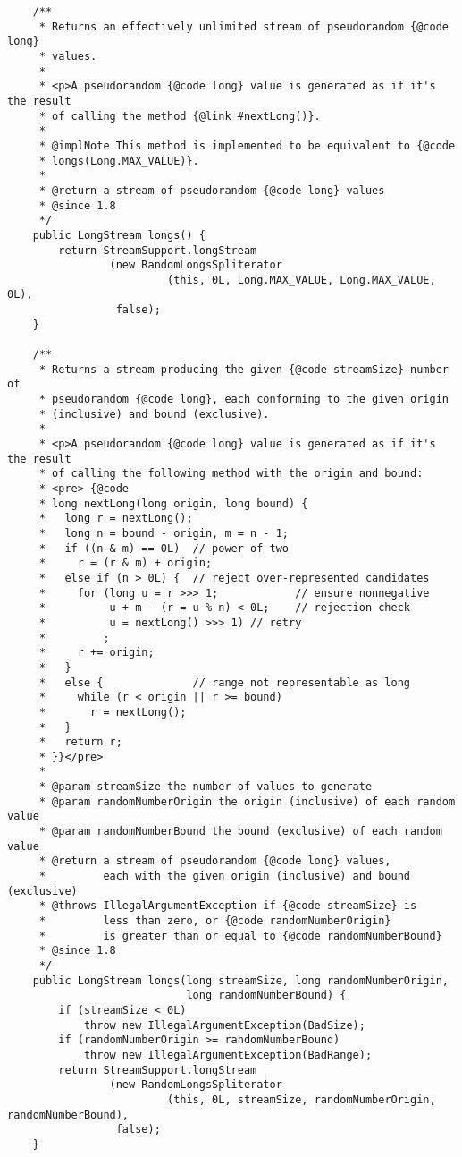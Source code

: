 \documentclass[12pt,a4paper,twoside,openright,titlepage,final]{article}
\begin{document}
\begin{verbatim}
    /**
     * Returns an effectively unlimited stream of pseudorandom {@code long}
     * values.
     *
     * <p>A pseudorandom {@code long} value is generated as if it's the result
     * of calling the method {@link #nextLong()}.
     *
     * @implNote This method is implemented to be equivalent to {@code
     * longs(Long.MAX_VALUE)}.
     *
     * @return a stream of pseudorandom {@code long} values
     * @since 1.8
     */
    public LongStream longs() {
        return StreamSupport.longStream
                (new RandomLongsSpliterator
                         (this, 0L, Long.MAX_VALUE, Long.MAX_VALUE, 0L),
                 false);
    }

    /**
     * Returns a stream producing the given {@code streamSize} number of
     * pseudorandom {@code long}, each conforming to the given origin
     * (inclusive) and bound (exclusive).
     *
     * <p>A pseudorandom {@code long} value is generated as if it's the result
     * of calling the following method with the origin and bound:
     * <pre> {@code
     * long nextLong(long origin, long bound) {
     *   long r = nextLong();
     *   long n = bound - origin, m = n - 1;
     *   if ((n & m) == 0L)  // power of two
     *     r = (r & m) + origin;
     *   else if (n > 0L) {  // reject over-represented candidates
     *     for (long u = r >>> 1;            // ensure nonnegative
     *          u + m - (r = u % n) < 0L;    // rejection check
     *          u = nextLong() >>> 1) // retry
     *         ;
     *     r += origin;
     *   }
     *   else {              // range not representable as long
     *     while (r < origin || r >= bound)
     *       r = nextLong();
     *   }
     *   return r;
     * }}</pre>
     *
     * @param streamSize the number of values to generate
     * @param randomNumberOrigin the origin (inclusive) of each random value
     * @param randomNumberBound the bound (exclusive) of each random value
     * @return a stream of pseudorandom {@code long} values,
     *         each with the given origin (inclusive) and bound (exclusive)
     * @throws IllegalArgumentException if {@code streamSize} is
     *         less than zero, or {@code randomNumberOrigin}
     *         is greater than or equal to {@code randomNumberBound}
     * @since 1.8
     */
    public LongStream longs(long streamSize, long randomNumberOrigin,
                            long randomNumberBound) {
        if (streamSize < 0L)
            throw new IllegalArgumentException(BadSize);
        if (randomNumberOrigin >= randomNumberBound)
            throw new IllegalArgumentException(BadRange);
        return StreamSupport.longStream
                (new RandomLongsSpliterator
                         (this, 0L, streamSize, randomNumberOrigin, randomNumberBound),
                 false);
    }


\end{verbatim}
\end{document}
